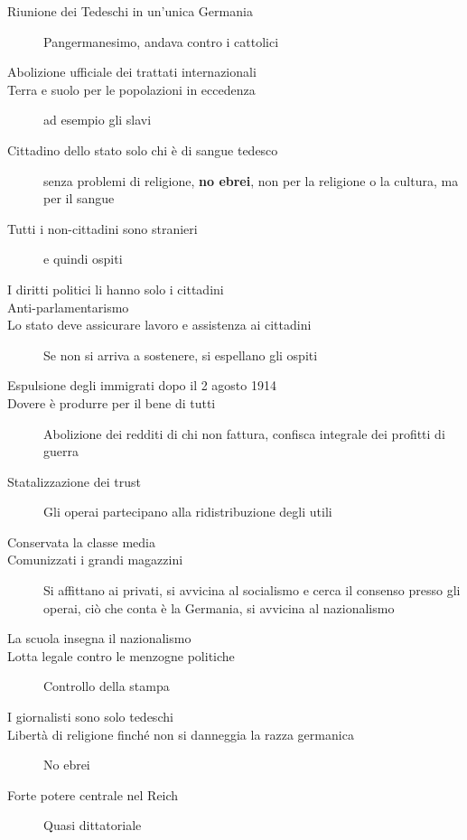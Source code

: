 \begin{description}
  \item[Riunione dei Tedeschi in un'unica Germania] Pangermanesimo, andava contro i cattolici
  \item[Abolizione ufficiale dei trattati internazionali]
  \item[Terra e suolo per le popolazioni in eccedenza] ad esempio gli slavi
  \item[Cittadino dello stato solo chi è di sangue tedesco] senza problemi di religione, 
    \textbf{no ebrei}, non per la religione o la cultura, ma per il sangue
  \item[Tutti i non-cittadini sono stranieri] e quindi ospiti
  \item[I diritti politici li hanno solo i cittadini]
  \item[Anti-parlamentarismo] 
  \item[Lo stato deve assicurare lavoro e assistenza ai cittadini] Se non si arriva a sostenere, si
    espellano gli ospiti
  \item[Espulsione degli immigrati dopo il 2 agosto 1914]
  \item[Dovere è produrre per il bene di tutti] Abolizione dei redditi di chi non fattura, confisca
    integrale dei profitti di guerra
  \item[Statalizzazione dei trust] Gli operai partecipano alla ridistribuzione degli utili
  \item[Conservata la classe media]
  \item[Comunizzati i grandi magazzini] Si affittano ai privati, si avvicina al socialismo e cerca il
    consenso presso gli operai, ciò che conta è la Germania, si avvicina al nazionalismo
  \item[La scuola insegna il nazionalismo]
  \item[Lotta legale contro le menzogne politiche] Controllo della stampa
  \item[I giornalisti sono solo tedeschi]
  \item[Libertà di religione finché non si danneggia la razza germanica] No ebrei
  \item[Forte potere centrale nel Reich] Quasi dittatoriale
\end{description}

